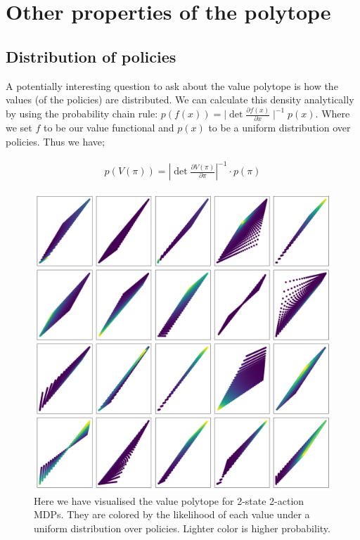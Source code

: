 \newpage

\section{Other properties of the polytope} \label{polytope-extras}



\subsection{Distribution of policies}

A potentially interesting question to ask about the value polytope is how the
values (of the policies) are distributed. We can calculate this
density analytically by using the probability chain rule:
\(p(f(x)) = \mid \det\frac{\partial f(x)}{\partial x}\mid^{-1}p(x)\).
Where we set \(f\) to be our value functional and \(p(x)\) to be a
uniform distribution over policies. Thus we have;

\begin{align*}
p(V(\pi)) = |\det \frac{\partial V(\pi)}{\partial \pi}|^{-1} \cdot p(\pi) \tag{density}
\end{align*}

\begin{figure}
\centering
\includegraphics[width=1\textwidth,height=1\textheight]{../../pictures/figures/polytope_densities.png}
\caption{Here we have visualised the value polytope for 2-state 2-action MDPs. They are colored by the likelihood of
each value under a uniform distribution over policies.
Lighter color is higher probability.}
\label{fig:density}
\end{figure}

